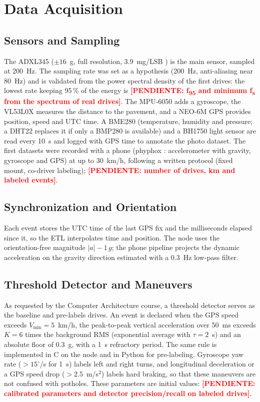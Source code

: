 \documentclass[journal,10pt]{IEEEtran}
\newcommand{\pendiente}[1]{\textcolor{red}{\textbf{[PENDIENTE: #1]}}}
\begin{document}
\section{Data Acquisition}
\subsection{Sensors and Sampling}
The ADXL345 (\(\pm 16\)~g, full resolution, 3.9~mg/LSB \cite{adi_adxl345}) is the main sensor, sampled at 200~Hz. The sampling rate was set as a hypothesis (200~Hz, anti-aliasing near 80~Hz) and is validated from the power spectral density of the first drives: the lowest rate keeping 95\,\% of the energy is \pendiente{f\textsubscript{95} and minimum f\textsubscript{s} from the spectrum of real drives}. The MPU-6050 adds a gyroscope, the VL53L0X measures the distance to the pavement, and a NEO-6M GPS provides position, speed and UTC time. A BME280 (temperature, humidity and pressure; a DHT22 replaces it if only a BMP280 is available) and a BH1750 light sensor are read every 10~s and logged with GPS time to annotate the photo dataset. The first datasets were recorded with a phone (phyphox \cite{staacks2018phyphox}: accelerometer with gravity, gyroscope and GPS) at up to 30~km/h, following a written protocol (fixed mount, co-driver labeling); \pendiente{number of drives, km and labeled events}.

\subsection{Synchronization and Orientation}
Each event stores the UTC time of the last GPS fix and the milliseconds elapsed since it, so the ETL interpolates time and position. The node uses the orientation-free magnitude \(|a| - 1\,g\); the phone pipeline projects the dynamic acceleration on the gravity direction estimated with a 0.3~Hz low-pass filter.

\subsection{Threshold Detector and Maneuvers}
As requested by the Computer Architecture course, a threshold detector serves as the baseline and pre-labels drives. An event is declared when the GPS speed exceeds \(V_{\min}=5\)~km/h, the peak-to-peak vertical acceleration over 50~ms exceeds \(K=6\) times the background RMS (exponential average with \(\tau=2\)~s) and an absolute floor of 0.3~g, with a 1~s refractory period. The same rule is implemented in C on the node and in Python for pre-labeling. Gyroscope yaw rate (\(>15^\circ\)/s for 1~s) labels left and right turns, and longitudinal deceleration or a GPS speed drop (\(>2.5\)~m/s\(^2\)) labels hard braking, so that these maneuvers are not confused with potholes. These parameters are initial values: \pendiente{calibrated parameters and detector precision/recall on labeled drives}.
\end{document}
